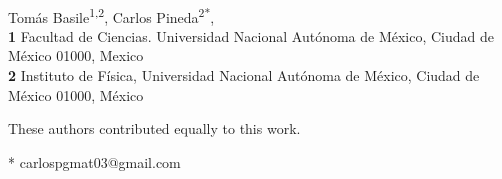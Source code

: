 \documentclass[10pt,letterpaper]{article} %
\begin{document}
\vspace*{0.2in}



\begin{flushleft}
{\Large
\textbf{} %
}
\newline
\\
Tomás Basile\textsuperscript{1,2\Yinyang},
Carlos Pineda\textsuperscript{2*\Yinyang},
\\
\bigskip
\textbf{1} Facultad de Ciencias. Universidad Nacional Autónoma de México, Ciudad de México 01000, Mexico
\\
\textbf{2} Instituto de Física, Universidad Nacional Autónoma de México, Ciudad de México 01000, México
\\
\bigskip

% 
%
\Yinyang These authors contributed equally to this work.





* carlospgmat03@gmail.com

\end{flushleft}
\end{document}
